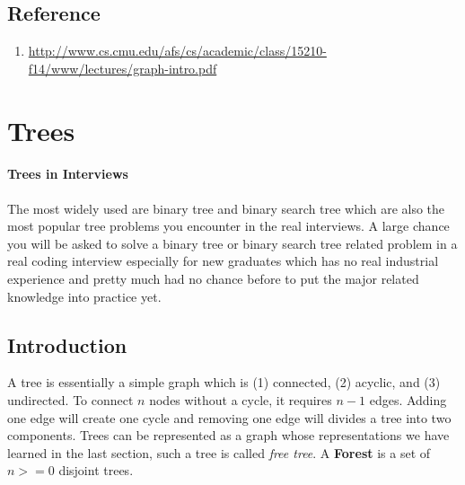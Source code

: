 \documentclass[../main.tex]{subfiles}
\begin{document}
\subsection{Reference}
\begin{enumerate}
    \item \url{http://www.cs.cmu.edu/afs/cs/academic/class/15210-f14/www/lectures/graph-intro.pdf}
\end{enumerate}
\section{Trees}
\label{chapter_abstract_data_structure_trees}

\paragraph{Trees in Interviews} The most widely used are binary tree and binary search tree which are also the most popular tree problems you encounter in the real interviews.
A large chance you will be asked to solve a binary tree or binary search tree related problem in a real coding interview especially for new graduates which has no real industrial experience and pretty much had no chance before to put the major related knowledge into practice yet. 
\subsection{Introduction}
A tree is essentially a simple graph which is (1) connected, (2) acyclic, and (3) undirected. To connect $n$ nodes without a cycle, it requires $n-1$ edges. Adding one edge will create one cycle and removing one edge will divides a tree into two components. Trees can be represented as a graph whose representations we have learned in the last section,  such a tree is called \textit{free tree}.  A \textbf{Forest} is a set of $n>=0$ disjoint trees. 
\end{document}
